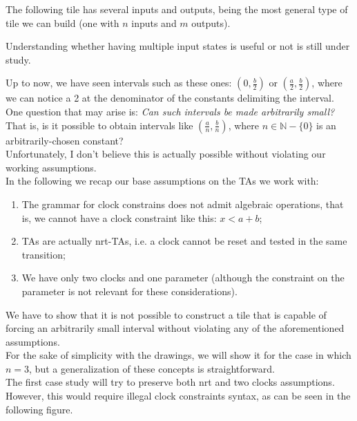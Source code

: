 \documentclass[12pt, a4paper]{article}
\begin{document}
\noindent
The following tile has several inputs and outputs, being the most general type of tile we can build (one with $n$ inputs and $m$ outputs).



\noindent
Understanding whether having multiple input states is useful or not is still under study.

\newpage

\noindent
Up to now, we have seen intervals such as these ones: $(0, \frac{b}{2})$ or $(\frac{a}{2}, \frac{b}{2})$, where we can notice a 2 at the denominator of the constants delimiting the interval.\\
One question that may arise is: \emph{Can such intervals be made arbitrarily small?} That is, is it possible to obtain intervals like $(\frac{a}{n}, \frac{b}{n})$, where $n \in \mathbb{N}-\{0\}$ is an arbitrarily-chosen constant?\\
Unfortunately, I don't believe this is actually possible without violating our working assumptions.\\

\noindent
In the following we recap our base assumptions on the TAs we work with:
\begin{enumerate}
\item The grammar for clock constrains does not admit algebraic operations, that is, we cannot have a clock constraint like this: $x < a + b$;
\item TAs are actually nrt-TAs, i.e. a clock cannot be reset and tested in the same transition;
\item We have only two clocks and one parameter (although the constraint on the parameter is not relevant for these considerations).
\end{enumerate}

\noindent
We have to show that it is not possible to construct a tile that is capable of forcing an arbitrarily small interval without violating any of the aforementioned assumptions.\\
For the sake of simplicity with the drawings, we will show it for the case in which $n = 3$, but a generalization of these concepts is straightforward.\\

\noindent
The first case study will try to preserve both nrt and two clocks assumptions. However, this would require illegal clock constraints syntax, as can be seen in the following figure.\\
\end{document}
